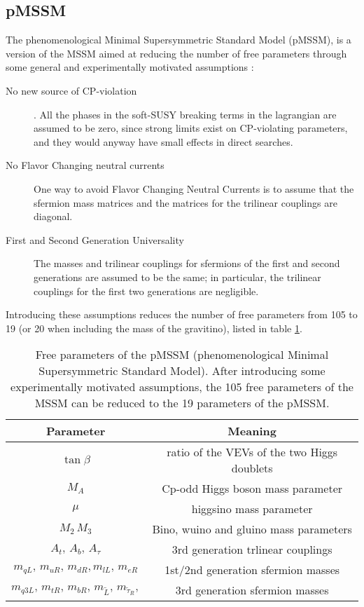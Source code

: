\subsection{pMSSM}

The phenomenological Minimal Supersymmetric Standard Model (pMSSM), is a version of the MSSM aimed at reducing the number of free parameters through some general and experimentally motivated assumptions \cite{djouadi:MSSM}:

\begin{description}
\item[No new source of CP-violation]. All the phases in the soft-SUSY breaking terms in the lagrangian are assumed to be zero, since strong limits exist on CP-violating parameters, and they would anyway have small effects in direct searches.

\item[No Flavor Changing neutral currents] One way to avoid Flavor Changing Neutral Currents is to assume that the sfermion mass matrices and the matrices for the trilinear couplings are diagonal.

\item[First and Second Generation Universality] The masses and trilinear couplings for sfermions of the first and second generations are assumed to be the same; in particular, the trilinear couplings for the first two generations are negligible.
\end{description}

Introducing these assumptions reduces the number of free parameters from 105 to 19 (or 20 when including the mass of the gravitino), listed in table \ref{tab:pMMSpar}.

\begin{table}[h]
\centering
\begin{tabular}{c c}
\hline 
Parameter & Meaning \\ 
\hline 
\hline
$\tan \beta$ & ratio of the VEVs of the two Higgs doublets \\ 
\hline 
$M_A$ & Cp-odd Higgs boson mass parameter \\ 
\hline 
$\mu$ & higgsino mass parameter \\ 
\hline 
$M_2  \, M_3 $ & Bino, wuino and gluino mass parameters \\ 
\hline 
$  A_t, \, A_b, \, A_\tau    $ & 3rd generation trlinear couplings \\ 
\hline 
$m_{qL},  \,  m_{uR},  \, m_{dR},  m_{lL},  \, m_{eR}$ & 1st/2nd generation sfermion masses \\ 
\hline 
 $m_{q3L}, \, m_{tR}, \, m_{bR}, \, m_{\tilde{L}}, \, m_{\tilde{\tau}_R},$ & 3rd generation sfermion masses \\ 
\hline 
\end{tabular} 
\caption[Free parameters of the pMSSM]{\label{tab:pMMSpar}Free parameters of the pMSSM (phenomenological Minimal Supersymmetric Standard Model). After introducing some experimentally motivated assumptions, the 105 free parameters of the MSSM can be reduced to the 19 parameters of the pMSSM.}
\end{table}

